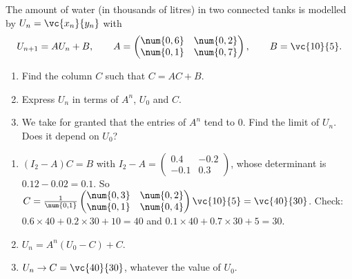 \begin{exercise}
The amount of water (in thousands of litres) in two connected tanks is modelled by $U_n=\vc{x_n}{y_n}$ with
\[U_{n+1}=AU_n+B,\qquad A=\begin{pmatrix}\num{0,6}&\num{0,2}\\\num{0,1}&\num{0,7}\end{pmatrix},\qquad B=\vc{10}{5}.\]
\begin{enumerate}
\item Find the column $C$ such that $C=AC+B$.
\item Express $U_n$ in terms of $A^n$, $U_0$ and $C$.
\item We take for granted that the entries of $A^n$ tend to $0$. Find the limit of $U_n$. Does it depend on $U_0$?
\end{enumerate}
\end{exercise}
\begin{solution}
\begin{enumerate}
\item $(I_2-A)C=B$ with $I_2-A=\begin{pmatrix}\num{0,4}&-\num{0,2}\\-\num{0,1}&\num{0,3}\end{pmatrix}$, whose determinant is $\num{0,12}-\num{0,02}=\num{0,1}$. So $C=\frac1{\num{0,1}}\begin{pmatrix}\num{0,3}&\num{0,2}\\\num{0,1}&\num{0,4}\end{pmatrix}\vc{10}{5}=\vc{40}{30}$. Check: $\num{0,6}\times40+\num{0,2}\times30+10=40$ and $\num{0,1}\times40+\num{0,7}\times30+5=30$.
\item $U_n=A^n(U_0-C)+C$.
\item $U_n\to C=\vc{40}{30}$, whatever the value of $U_0$.
\end{enumerate}
\end{solution}

